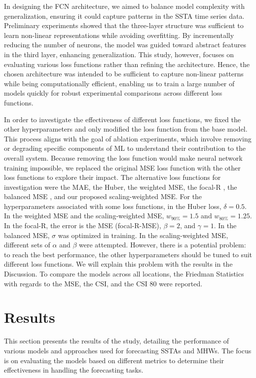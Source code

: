 \documentclass[11pt, a4paper]{article}
\begin{document}
In designing the FCN architecture, we aimed to balance model complexity with generalization, ensuring it could capture patterns in the SSTA time series data. Preliminary experiments showed that the three-layer structure was sufficient to learn non-linear representations while avoiding overfitting. By incrementally reducing the number of neurons, the model was guided toward abstract features in the third layer, enhancing generalization. This study, however, focuses on evaluating various loss functions rather than refining the architecture. Hence, the chosen architecture was intended to be sufficient to capture non-linear patterns while being computationally efficient, enabling us to train a large number of models quickly for robust experimental comparisons across different loss functions.

In order to investigate the effectiveness of different loss functions, we fixed the other hyperparameters and only modified the loss function from the base model. This process aligns with the goal of ablation experiments, which involve removing or degrading specific components of ML to understand their contribution to the overall system. Because removing the loss function would make neural network training impossible, we replaced the original MSE loss function with the other loss functions to explore their impact. The alternative loss functions for investigation were the MAE, the Huber, the weighted MSE, the focal-R \citep{yang2021delving}, the balanced MSE \citep{ren2022balanced}, and our proposed scaling-weighted MSE. For the hyperparameters associated with some loss functions, in the Huber loss, $\delta=0.5$. In the weighted MSE and the scaling-weighted MSE, $w_{90\%}=1.5$ and $w_{80\%}=1.25$. In the focal-R, the error is the MSE (focal-R-MSE), $\beta=2$, and $\gamma=1$. In the balanced MSE, $\sigma$ was optimized in training. In the scaling-weighted MSE, different sets of $\alpha$ and $\beta$ were attempted. However, there is a potential problem: to reach the best performance, the other hyperparameters should be tuned to suit different loss functions. We will explain this problem with the results in the Discussion. To compare the models across all locations, the Friedman Statistics with regards to the MSE, the CSI, and the CSI 80 were reported.

\section{Results}

This section presents the results of the study, detailing the performance of various models and approaches used for forecasting SSTAs and MHWs. The focus is on evaluating the models based on different metrics to determine their effectiveness in handling the forecasting tasks.
\end{document}

